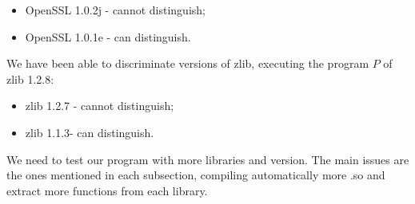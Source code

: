 \documentclass{article}
\begin{document}
        \begin{itemize}
            \item OpenSSL 1.0.2j - cannot distinguish; 
            \item OpenSSL 1.0.1e - can distinguish.
        \end{itemize}


   		We have been able to discriminate versions of zlib, executing the program $P$ of zlib 1.2.8:
        \begin{itemize}
            \item zlib 1.2.7 - cannot distinguish; 
            \item zlib 1.1.3- can distinguish.
        \end{itemize}


   	
	   	We need to test our program with more libraries and version. The main issues are the ones mentioned in each subsection, compiling automatically more .so and extract more functions from each library.

    
    

\iffalse    
    \subsection{Other tools}

		\subsubsection{Coccinelle} 
			Coccinelle uses static analysis to find pattern in C source code. Using a known bug as a pattern leads to discover if the patch was applied or not. It seems not to be interesting in our case, because we deal with binaries.
		\subsubsection{n-gram}
\fi
\end{document}
